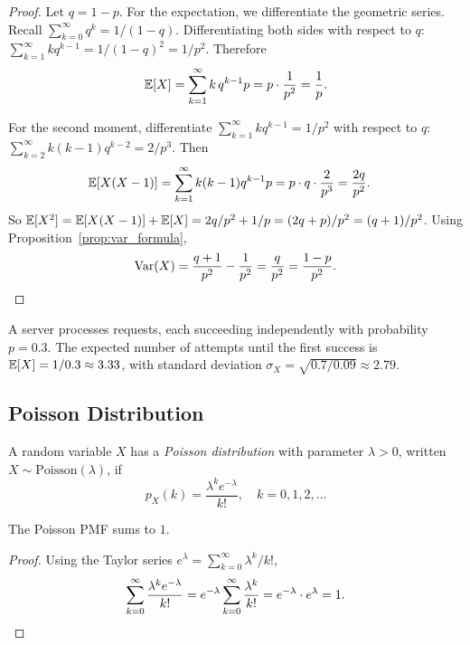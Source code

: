 \documentclass[11pt,a4paper]{article}
\begin{document}
\begin{proof}
Let $q = 1 - p$. For the expectation, we differentiate the geometric
series. Recall $\sum_{k=0}^\infty q^k = 1/(1-q)$. Differentiating both
sides with respect to $q$:
$\sum_{k=1}^\infty k q^{k-1} = 1/(1-q)^2 = 1/p^2$.
Therefore
\[
    \mathbb{E}[X] = \sum_{k=1}^\infty k \, q^{k-1} p
    = p \cdot \frac{1}{p^2} = \frac{1}{p}.
\]

For the second moment, differentiate $\sum_{k=1}^\infty k q^{k-1} =
1/p^2$ with respect to $q$:
$\sum_{k=2}^\infty k(k-1) q^{k-2} = 2/p^3$.
Then
\begin{align*}
    \mathbb{E}[X(X-1)] &= \sum_{k=1}^\infty k(k-1) q^{k-1} p
    = p \cdot q \cdot \frac{2}{p^3} = \frac{2q}{p^2}.
\end{align*}
So $\mathbb{E}[X^2] = \mathbb{E}[X(X-1)] + \mathbb{E}[X] = 2q/p^2 + 1/p = (2q + p)/p^2
= (q + 1)/p^2$. Using Proposition~\ref{prop:var_formula},
\[
    \operatorname{Var}(X) = \frac{q + 1}{p^2} - \frac{1}{p^2}
    = \frac{q}{p^2} = \frac{1-p}{p^2}. \qedhere
\]
\end{proof}

\begin{example}
\label{ex:geometric_waiting}
A server processes requests, each succeeding independently with
probability $p = 0.3$. The expected number of attempts until the first
success is $\mathbb{E}[X] = 1/0.3 \approx 3.33$, with standard deviation
$\sigma_X = \sqrt{0.7/0.09} \approx 2.79$.
\end{example}

\subsection{Poisson Distribution}

\begin{definition}
\label{def:poisson}
A random variable $X$ has a \emph{Poisson distribution} with parameter
$\lambda > 0$, written $X \sim \mathrm{Poisson}(\lambda)$, if
\[
    p_X(k) = \frac{\lambda^k e^{-\lambda}}{k!}, \quad k = 0, 1, 2, \ldots
\]
\end{definition}

\begin{proposition}
\label{prop:poisson_valid}
The Poisson PMF sums to $1$.
\end{proposition}

\begin{proof}
Using the Taylor series $e^\lambda = \sum_{k=0}^\infty \lambda^k / k!$,
\[
    \sum_{k=0}^\infty \frac{\lambda^k e^{-\lambda}}{k!}
    = e^{-\lambda} \sum_{k=0}^\infty \frac{\lambda^k}{k!}
    = e^{-\lambda} \cdot e^\lambda = 1. \qedhere
\]
\end{proof}
\end{document}
